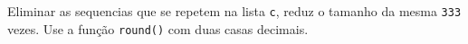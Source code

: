 \documentclass[12pt,varwidth=16cm,border=1pt]{standalone}
\begin{document}
Eliminar as sequencias que se repetem na lista \verb+c+, reduz o tamanho da mesma \verb+333+ vezes. Use a função \verb+round()+ com duas casas decimais.

\questiomfalse
\end{document}

